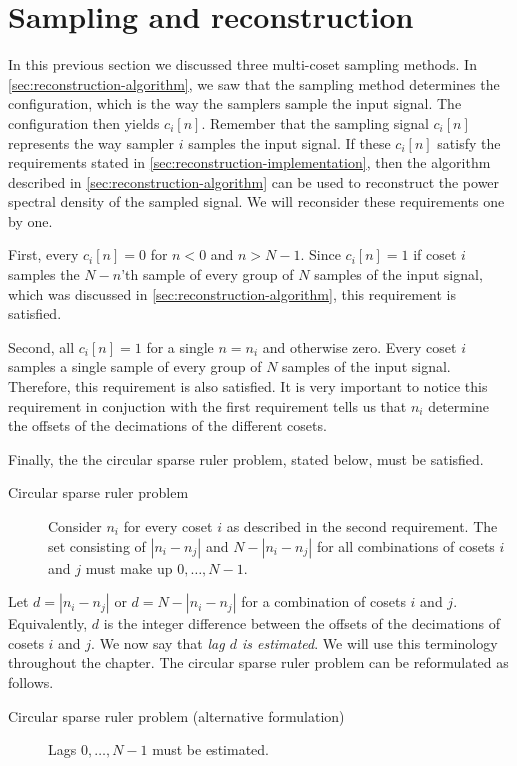 \documentclass[a4paper, openany, oneside]{memoir}
\begin{document}
\section{Sampling and reconstruction}
In this previous section we discussed three multi-coset sampling methods. In \cref{sec:reconstruction-algorithm}, we saw that the sampling method determines the configuration, which is the way the samplers sample the input signal. The configuration then yields $c_i[n]$. Remember that the sampling signal $c_i[n]$ represents the way sampler $i$ samples the input signal. If these $c_i[n]$ satisfy the requirements stated in \cref{sec:reconstruction-implementation}, then the algorithm described in \cref{sec:reconstruction-algorithm} can be used to reconstruct the power spectral density of the sampled signal. We will reconsider these requirements one by one.

First, every $c_i[n]=0$ for $n < 0$ and $n > N-1$. Since $c_i[n]=1$ if coset $i$ samples the $N-n$'th sample of every group of $N$ samples of the input signal, which was discussed in \cref{sec:reconstruction-algorithm}, this requirement is satisfied.

Second, all $c_i[n]=1$ for a single $n=n_i$ and otherwise zero. Every coset $i$ samples a single sample of every group of $N$ samples of the input signal. Therefore, this requirement is also satisfied. It is very important to notice this requirement in conjuction with the first requirement tells us that $n_i$ determine the offsets of the decimations of the different cosets.

Finally, the the circular sparse ruler problem, stated below, must be satisfied.

\begin{description}
    \item[Circular sparse ruler problem] Consider $n_i$ for every coset $i$ as described in the second requirement. The set consisting of $|n_i - n_j|$ and $N-|n_i-n_j|$ for all combinations of cosets $i$ and $j$ must make up $0,\ldots,N-1$.
\end{description}

Let $d=|n_i - n_j|$ or $d=N-|n_i-n_j|$ for a combination of cosets $i$ and $j$. Equivalently, $d$ is the integer difference between the offsets of the decimations of cosets $i$ and $j$. We now say that \textit{lag $d$ is estimated}. We will use this terminology throughout the chapter. The circular sparse ruler problem can be reformulated as follows.

\begin{description}
    \item[Circular sparse ruler problem (alternative formulation)] Lags $0,\ldots,N-1$ must be estimated.
\end{description}
\end{document}

